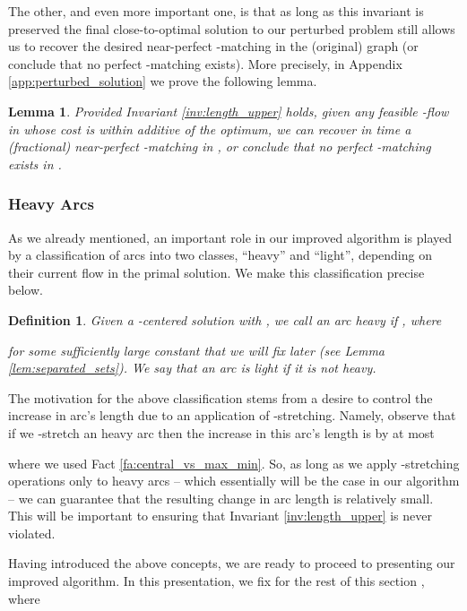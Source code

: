 \documentclass[11pt, letterpaper]{article}
\newtheorem{lemma}[theorem]{Lemma}
\newtheorem{definition}[theorem]{Definition}
\begin{document}
The other, and even more important one, is that as long as this invariant is preserved the final close-to-optimal solution  to our perturbed problem still allows us to recover the desired near-perfect -matching in the (original) graph  (or conclude that no perfect -matching exists). More precisely, in Appendix \ref{app:perturbed_solution} we prove the following lemma.

\begin{lemma}
\label{lem:perturbed_solution}
Provided Invariant \ref{inv:length_upper} holds, given any feasible -flow  in  whose cost is within additive  of the optimum, we can recover in  time a (fractional) near-perfect -matching in , or conclude that no perfect -matching exists in . 
\end{lemma}

\subsubsection*{Heavy Arcs}

As we already mentioned, an important role in our improved algorithm is played by a classification of arcs into two classes, ``heavy'' and ``light'', depending on their current flow in the primal solution. We make this classification precise below.  

\begin{definition}\label{def:heavy}
Given a -centered solution  with , we call an arc  {\em heavy} if , where

for some sufficiently large constant  that we will fix later (see Lemma \ref{lem:separated_sets}). We say that an arc is {\em light} if it is not heavy.
\end{definition}

The motivation for the above classification stems from a desire to control the increase in arc's length due to an application of -stretching.  Namely, observe that if we -stretch an heavy arc  then the increase in this arc's length is by at most 
 
where we used Fact \ref{fa:central_vs_max_min}. So, as long as we apply -stretching operations only to heavy arcs -- which essentially will be the case in our algorithm -- we can guarantee that the resulting change in arc length is relatively small. This will be important to ensuring that Invariant \ref{inv:length_upper} is never violated. 


Having introduced the above concepts, we are ready to proceed to presenting our improved algorithm. In this presentation, we fix for the rest of this section , where 
\end{document}

